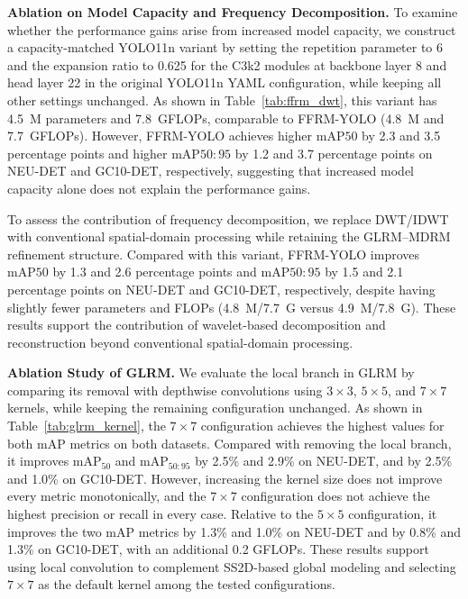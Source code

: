 \documentclass[pdflatex,sn-nature]{sn-jnl}
\begin{document}
\noindent\textbf{Ablation on Model Capacity and Frequency Decomposition.} To examine whether the performance gains arise from increased model capacity, we construct a capacity-matched YOLO11n variant by setting the repetition parameter to 6 and the expansion ratio to 0.625 for the C3k2 modules at backbone layer 8 and head layer 22 in the original YOLO11n YAML configuration, while keeping all other settings unchanged. As shown in Table~\ref{tab:ffrm_dwt}, this variant has 4.5~M parameters and 7.8~GFLOPs, comparable to FFRM-YOLO (4.8~M and 7.7~GFLOPs). However, FFRM-YOLO achieves higher $\mathrm{mAP}{50}$ by 2.3 and 3.5 percentage points and higher $\mathrm{mAP}{50:95}$ by 1.2 and 3.7 percentage points on NEU-DET and GC10-DET, respectively, suggesting that increased model capacity alone does not explain the performance gains.

To assess the contribution of frequency decomposition, we replace DWT/IDWT with conventional spatial-domain processing while retaining the GLRM--MDRM refinement structure. Compared with this variant, FFRM-YOLO improves $\mathrm{mAP}{50}$ by 1.3 and 2.6 percentage points and $\mathrm{mAP}{50:95}$ by 1.5 and 2.1 percentage points on NEU-DET and GC10-DET, respectively, despite having slightly fewer parameters and FLOPs (4.8~M/7.7~G versus 4.9~M/7.8~G). These results support the contribution of wavelet-based decomposition and reconstruction beyond conventional spatial-domain processing.




\noindent\textbf{Ablation Study of GLRM.} We evaluate the local branch in GLRM by comparing its removal with depthwise convolutions using $3\times3$, $5\times5$, and $7\times7$ kernels, while keeping the remaining configuration unchanged. As shown in Table~\ref{tab:glrm_kernel}, the $7\times7$ configuration achieves the highest values for both mAP metrics on both datasets. Compared with removing the local branch, it improves $\mathrm{mAP}_{50}$ and $\mathrm{mAP}_{50:95}$ by 2.5\% and 2.9\% on NEU-DET, and by 2.5\% and 1.0\% on GC10-DET. However, increasing the kernel size does not improve every metric monotonically, and the $7\times7$ configuration does not achieve the highest precision or recall in every case. Relative to the $5\times5$ configuration, it improves the two mAP metrics by 1.3\% and 1.0\% on NEU-DET and by 0.8\% and 1.3\% on GC10-DET, with an additional 0.2 GFLOPs. These results support using local convolution to complement SS2D-based global modeling and selecting $7\times7$ as the default kernel among the tested configurations.
\end{document}
